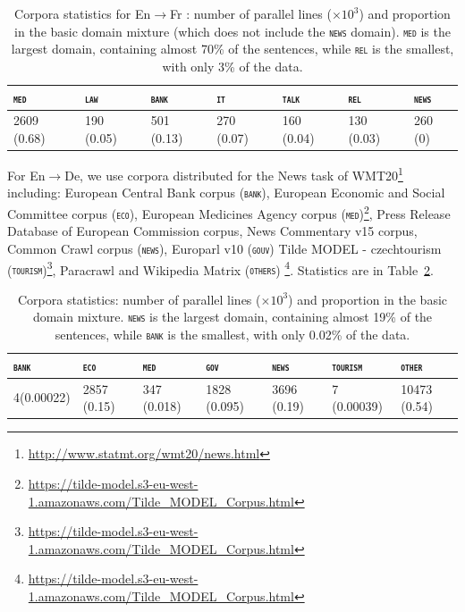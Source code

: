 \documentclass[11pt,a4paper]{article}
\newcommand{\domain}[1]{\texttt{\textsc{#1}}}
\begin{document}
\begin{table}[htbp]
  \centering
  \begin{tabular}{ |lllllll|} %
    \hline
    \domain{med} & \domain{law} & \domain{bank} & \domain{it} & \domain{talk} & \domain{rel} & \domain{news} \\
    \hline
    2609 (0.68) & 190 (0.05)  & 501 (0.13) & 270 (0.07) & 160 (0.04) & 130 (0.03) & 260 (0) \\
    \hline
  \end{tabular}
\caption{Corpora statistics for En$\rightarrow$Fr : number of parallel lines ($\times 10^3$) and proportion in the basic domain mixture (which does not include the \domain{news} domain). \domain{med} is the largest domain, containing almost 70\% of the sentences, while \domain{rel} is the smallest, with only 3\% of the data.}
\label{tab:Corpora-en-fr}
\end{table}

For En$\rightarrow$De, we use corpora distributed for the News task of WMT20\footnote{\url{http://www.statmt.org/wmt20/news.html}} including: European Central Bank corpus (\domain{bank}),  European Economic and Social Committee corpus (\domain{eco}), European Medicines Agency corpus (\domain{med})\footnote{\url{https://tilde-model.s3-eu-west-1.amazonaws.com/Tilde_MODEL_Corpus.html}}, Press Release Database of European Commission corpus, News Commentary v15 corpus, Common Crawl corpus (\domain{news}), Europarl v10 (\domain{gouv}) Tilde MODEL - czechtourism (\domain{tourism})\footnote{\url{https://tilde-model.s3-eu-west-1.amazonaws.com/Tilde_MODEL_Corpus.html}}, Paracrawl and Wikipedia Matrix (\domain{others}) \footnote{\url{https://tilde-model.s3-eu-west-1.amazonaws.com/Tilde_MODEL_Corpus.html}}. Statistics are in Table~\ref{tab:Corpora-en-de}.
\begin{table}[htbp]
  \centering
  \begin{tabular}{ |lllllll|} %
    \hline
    \domain{bank} & \domain{eco} & \domain{med} & \domain{gov} & \domain{news} & \domain{tourism} & \domain{other} \\
    \hline
    4(0.00022) & 2857 (0.15) & 347 (0.018) & 1828 (0.095) & 3696 (0.19) & 7 (0.00039) & 10473 (0.54) \\
    \hline
  \end{tabular}
\caption{Corpora statistics: number of parallel lines ($\times 10^3$) and proportion in the basic domain mixture. \domain{news} is the largest domain, containing almost 19\% of the sentences, while \domain{bank} is the smallest, with only 0.02\% of the data.}
\label{tab:Corpora-en-de}
\end{table}
\end{document}
